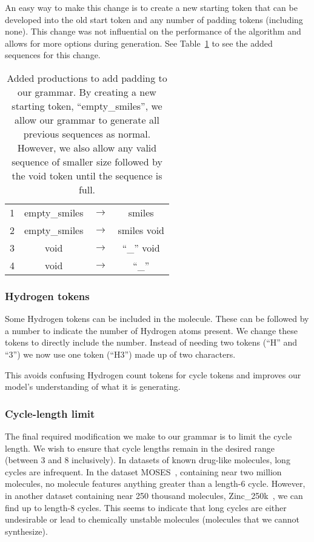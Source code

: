 \documentclass[../Document.tex]{subfiles}
\begin{document}
An easy way to make this change is to create a new starting token that can be developed into the old start token and any number of padding tokens (including none). This change was not influential on the performance of the algorithm and allows for more options during generation. See Table~\ref{tab:grammar-padding} to see the added sequences for this change.

\begin{table}[t]
    \centering
    \begin{tabular}{r|ccc}
        1 & empty\_smiles & $\rightarrow$ & smiles \\
        2 & empty\_smiles & $\rightarrow$ & smiles void \\
        3 & void & $\rightarrow$ & ``\_'' void \\
        4 & void & $\rightarrow$ & ``\_'' \\
    \end{tabular}
    \caption[Added productions to add padding to our grammar.]{Added productions to add padding to our grammar. By creating a new starting token, ``empty\_smiles'', we allow our grammar to generate all previous sequences as normal. However, we also allow any valid sequence of smaller size followed by the void token until the sequence is full.}
    \label{tab:grammar-padding}
\end{table}


\subsubsection{Hydrogen tokens}
Some Hydrogen tokens can be included in the molecule. These can be followed by a number to indicate the number of Hydrogen atoms present. We change these tokens to directly include the number.
Instead of needing two tokens (``H'' and ``3'') we now use one token (``H3'') made up of two characters.

This avoids confusing Hydrogen count tokens for cycle tokens and improves our model's understanding of what it is generating.


\subsubsection{Cycle-length limit}
The final required modification we make to our grammar is to limit the cycle length.
We wish to ensure that cycle lengths remain in the desired range (between 3 and 8 inclusively).
In datasets of known drug-like molecules, long cycles are infrequent.
In the dataset MOSES~\cite{MOSES}, containing near two million molecules, no molecule features anything greater than a length-6 cycle. However, in another dataset containing near 250 thousand molecules, Zinc\_250k~\cite{Akhmetshin2021}, we can find up to length-8 cycles.
This seems to indicate that long cycles are either undesirable or lead to chemically unstable molecules (\ie molecules that we cannot synthesize).
\end{document}

